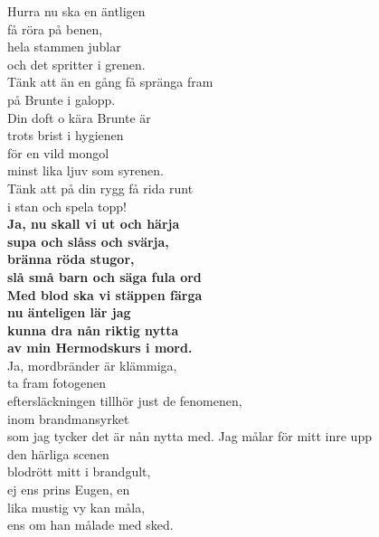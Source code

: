 \documentclass[a6paper,10pt]{article}
\begin{document}
\setlength{\oddsidemargin}{-0.47in}
\begin{center}
\end{center}
\begin{lyrics}
Hurra nu ska en äntligen \\få röra på benen,\\
hela stammen jublar \\och det spritter i grenen.\\
Tänk att än en gång få spränga fram \\på Brunte i galopp.
\vspace{5pt}\\
Din doft o kära Brunte är \\trots brist i hygienen\\
för en vild mongol\\ minst lika ljuv som syrenen.\\
Tänk att på din rygg få rida runt \\i stan och spela topp! 
\vspace{5pt}\\
\textbf{Ja, nu skall vi ut och härja\\
supa och slåss och svärja,\\
bränna röda stugor,\\
slå små barn och säga fula ord\\
Med blod ska vi stäppen färga\\
nu änteligen lär jag\\
kunna dra nån riktig nytta \\
av min Hermodskurs i mord. }
\vspace{5pt}\\
Ja, mordbränder är klämmiga, \\ta fram fotogenen\\
eftersläckningen tillhör just de fenomenen,\\
inom brandmansyrket \\som jag tycker det är nån nytta med.
\newpage 
\setlength{\oddsidemargin}{-0.37in}
\noindent
Jag målar för mitt inre upp \\den härliga scenen\\
blodrött mitt i brandgult, \\ej ens prins Eugen, en\\
lika mustig vy kan måla, \\ens om han målade med sked.
\vspace{5pt}\\

\end{lyrics}
\end{document}
